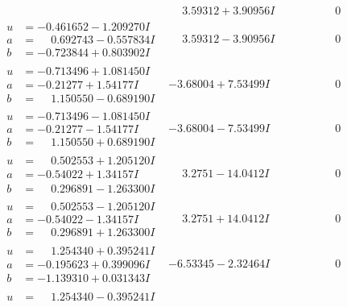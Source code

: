 \documentclass[1p]{elsarticle_modified}
\theoremstyle{definition}
\begin{document}
$$\begin{array}{c|c|c}
 & \phantom{-}3.59312 + 3.90956 I & \phantom{-0.000000 } 0 \\ \hline\begin{aligned}
u &= -0.461652 - 1.209270 I \\
a &= \phantom{-}0.692743 - 0.557834 I \\
b &= -0.723844 + 0.803902 I\end{aligned}
 & \phantom{-}3.59312 - 3.90956 I & \phantom{-0.000000 } 0 \\ \hline\begin{aligned}
u &= -0.713496 + 1.081450 I \\
a &= -0.21277 + 1.54177 I \\
b &= \phantom{-}1.150550 - 0.689190 I\end{aligned}
 & -3.68004 + 7.53499 I & \phantom{-0.000000 } 0 \\ \hline\begin{aligned}
u &= -0.713496 - 1.081450 I \\
a &= -0.21277 - 1.54177 I \\
b &= \phantom{-}1.150550 + 0.689190 I\end{aligned}
 & -3.68004 - 7.53499 I & \phantom{-0.000000 } 0 \\ \hline\begin{aligned}
u &= \phantom{-}0.502553 + 1.205120 I \\
a &= -0.54022 + 1.34157 I \\
b &= \phantom{-}0.296891 - 1.263300 I\end{aligned}
 & \phantom{-}3.2751 - 14.0412 I & \phantom{-0.000000 } 0 \\ \hline\begin{aligned}
u &= \phantom{-}0.502553 - 1.205120 I \\
a &= -0.54022 - 1.34157 I \\
b &= \phantom{-}0.296891 + 1.263300 I\end{aligned}
 & \phantom{-}3.2751 + 14.0412 I & \phantom{-0.000000 } 0 \\ \hline\begin{aligned}
u &= \phantom{-}1.254340 + 0.395241 I \\
a &= -0.195623 + 0.399096 I \\
b &= -1.139310 + 0.031343 I\end{aligned}
 & -6.53345 - 2.32464 I & \phantom{-0.000000 } 0 \\ \hline\begin{aligned}
u &= \phantom{-}1.254340 - 0.395241 I \\

\end{aligned}
\end{array}$$
\end{document}
